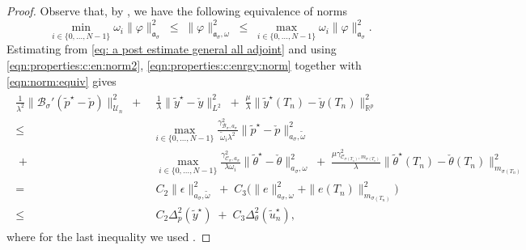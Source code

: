 \documentclass[reqno]{amsart}
\newcommand{\U}{{\mathscr U}}
\newcommand{\R}{\mathbb R}
\newcommand{\state}{\theta}
\newcommand{\adState}{p}
\newcommand{\inpVar}{u}
\newcommand{\outVar}{y}
\newcommand{\outVarDim}{p}
\newcommand{\bOper}{\calB}
\newcommand{\cOper}{\calC}
\newcommand{\switch}{\sigma}
\newcommand{\reduce}[1]{\tilde{#1}}
\newcommand{\BoundControlB}{\Delta_{B}}
\newcommand{\err}{e}
\newcommand{\addErr}{\epsilon}
\newcommand{\stateRed}{\reduce{\state}}
\newcommand{\adStateRed}{\reduce{\adState}}
\newcommand{\outVarRed}{\reduce{\outVar}}
\newcommand{\optStateRed}{\stateRed^\star}
\newcommand{\optAdStateRed}{\adStateRed^\star}
\newcommand{\optInpVarRed}[1]{\reduce{\inpVar}_{#1}^\star}
\newcommand{\optInpVarRedN}{\optInpVarRed{n}}
\newcommand{\optOutVarRed}{\outVarRed^\star}
\newcommand{\intermediateState}{\check{\state}}
\newcommand{\intermediateAdStateB}{\check{\adState}}
\newcommand{\intermediateOutVar}{\check{\outVar}}
\newcommand{\calB}{\mathcal{B}}
\newcommand{\calC}{\mathcal{C}}
\begin{document}
\begin{proof}
Observe that, by , we have the following equivalence of norms
\begin{equation}\label{eqn:norm:equiv}
    \min_{i\in\{0,\ldots,N-1\}}\omega_i\|\varphi\|^2_{\mathfrak{a}_{\switch}}\;\le\;\|\varphi\|_{\mathfrak{a}_\switch,\omega}^2\;\le\;\max_{i\in\{0,\ldots,N-1\}}\omega_i\|\varphi\|^2_{\mathfrak{a}_{\switch}}.
\end{equation}
Estimating from \eqref{eq: a post estimate general all adjoint} and using \eqref{eqn:properties:c:en:norm2}, \eqref{eqn:properties:c:enrgy:norm}
together with \eqref{eqn:norm:equiv} gives 
    \begin{align*}
    \begin{aligned}
        \tfrac{1}{\lambda^2} \|\bOper_{\switch}' (\optAdStateRed-\intermediateAdStateB)\|_{\U_n}^2 \; +&\;\tfrac{1}{\lambda} \|\optOutVarRed - \intermediateOutVar\|_{L^2}^2 \; + \;\tfrac{\mu}{\lambda}\|\optOutVarRed(T_n)-\intermediateOutVar(T_n)\|_{\R^{\outVarDim}}^2\\
        \leq &  \max_{i\in\{0,\ldots,N-1\}}\tfrac{\gamma^2_{\bOper_{\switch},{a}_{\switch}}}{\tilde \omega_i\lambda^2} \|\optAdStateRed-\intermediateAdStateB\|_{a_\switch,\tilde \omega}^2  \\
         \;+&\; \max_{i\in\{0,\ldots,N-1\}}\tfrac{\gamma^2_{\cOper_{\switch},{a}_{\switch}}}{\lambda \omega_i}
        \|\optStateRed - \intermediateState\|_{a_\switch, {\omega}}^2  \;+\; \tfrac{\mu \gamma^2_{\cOper_{\sigma(T_n)},m_{\switch(T_n)}}}{\lambda}\|\optStateRed(T_n)-\intermediateState(T_n)\|_{m_{\switch(T_n)}}^2\\
        = &\; C_2\|\addErr\|_{a_\switch,\tilde \omega}^2 \; +\; C_3\big(
        \|\err\|_{a_\switch, {\omega}}^2  + \|\err(T_n)\|_{m_{\switch(T_n)}}^2\big)\\
        \leq &\; C_2 \Delta^2_{\adState}(\optOutVarRed) \; +\; C_3\Delta^2_{\state}(\optInpVarRedN),
        \end{aligned}
    \end{align*}
    where for the last inequality we used .
\end{proof}
\end{document}
